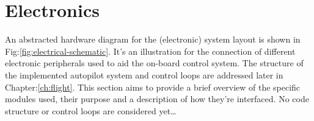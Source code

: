 \section{Electronics}
\label{sec:proto.layout}
{\centering
\vspace{-20pt}
\begin{minipage}{\textwidth}
\centering
{}
\end{minipage}
\vspace{-10pt}
\label{fig:electrical-schematic}
}
\newpage
An abstracted hardware diagram for the (electronic) system layout is shown in Fig:\ref{fig:electrical-schematic}. It's an illustration for the connection of different electronic peripherals used to aid the on-board control system. The structure of the implemented autopilot system and control loops are addressed later in Chapter:\ref{ch:flight}. This section aims to provide a brief overview of the specific modules used, their purpose and a description of how they're interfaced. No code structure or control loops are considered yet\ldots
